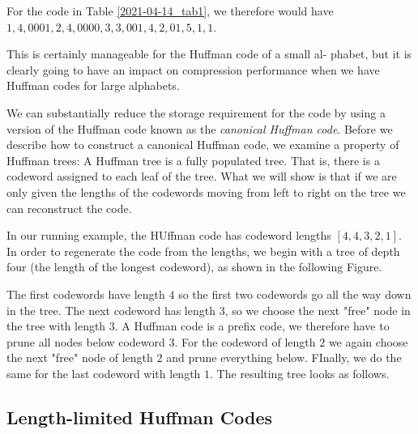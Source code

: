 For the code in Table \ref{2021-04-14_tab1}, we therefore would have $1, 4, 0001, 2, 4, 0000, 3, 3, 001, 4, 2, 01, 5, 1, 1$.

This is certainly manageable for the Huffman code of a small al- phabet, but it is clearly going to have an impact on compression performance when we have Huffman codes for large alphabets.


We can substantially reduce the storage requirement for the code by using a version of the Huffman code known as the \emph{canonical Huffman code}. Before we describe how to construct a canonical Huffman code, we examine a property of Huffman trees: A Huffman tree is a fully populated tree. That is, there is a codeword assigned to each leaf of the tree. What we will show is that if we are only given the lengths of the codewords moving from left to right on the tree we can reconstruct the code.

In our running example, the HUffman code has codeword lengths $[4, 4, 3, 2, 1]$. In order to regenerate the code from the lengths, we begin with a tree of depth four (the length of the longest codeword), as shown in the following Figure.

The first codewords have length $4$ so the first two codewords go all the way down in the tree. The next codeword has length $3$, so we choose the next "free" node in the tree with length $3$. A Huffman code is a prefix code, we therefore have to prune all nodes below codeword $3$. For the codeword of length $2$ we again choose the next "free" node of length $2$ and prune everything below. FInally, we do the same for the last codeword with length $1$. The resulting tree looks as follows.






\subsection{Length-limited Huffman Codes}


